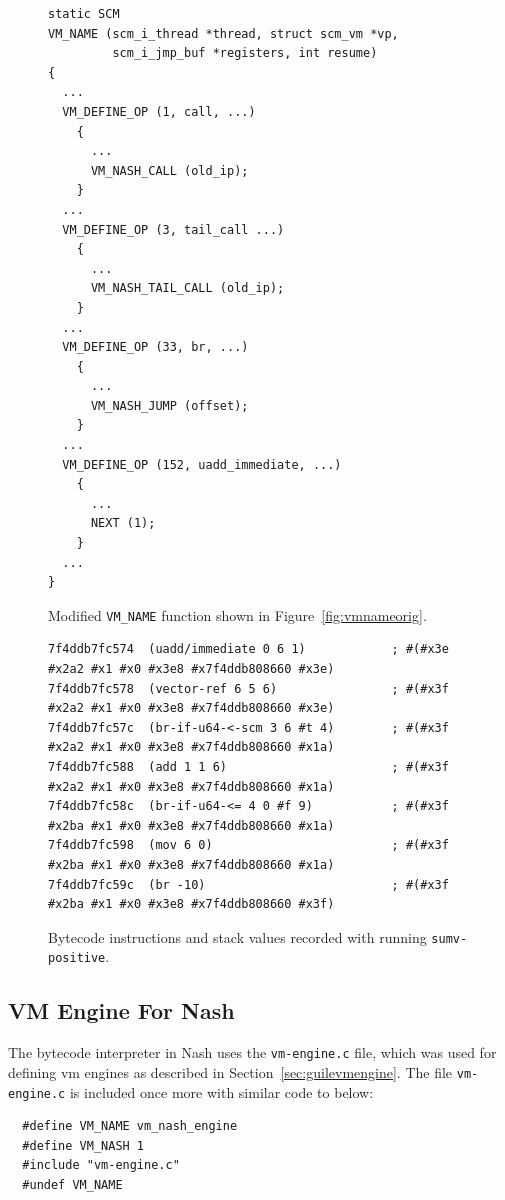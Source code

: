 \documentclass[preprint, 10pt]{sigplanconf}
\begin{document}
\begin{figure}
  \centering
  \small
\begin{verbatim}
static SCM
VM_NAME (scm_i_thread *thread, struct scm_vm *vp,
         scm_i_jmp_buf *registers, int resume)
{
  ...
  VM_DEFINE_OP (1, call, ...)
    {
      ...
      VM_NASH_CALL (old_ip);
    }
  ...
  VM_DEFINE_OP (3, tail_call ...)
    {
      ...
      VM_NASH_TAIL_CALL (old_ip);
    }
  ...
  VM_DEFINE_OP (33, br, ...)
    {
      ...
      VM_NASH_JUMP (offset);
    }
  ...
  VM_DEFINE_OP (152, uadd_immediate, ...)
    {
      ...
      NEXT (1);
    }
  ...
}
\end{verbatim}
\caption{Modified \texttt{VM\_NAME} function shown in
  Figure~\hyperref[fig:vmnameorig]{\ref{fig:vmnameorig}}.}
\label{fig:vmnamenash}
\end{figure}

\begin{figure}
  \centering
  \small
\begin{verbatim}
7f4ddb7fc574  (uadd/immediate 0 6 1)            ; #(#x3e #x2a2 #x1 #x0 #x3e8 #x7f4ddb808660 #x3e)
7f4ddb7fc578  (vector-ref 6 5 6)                ; #(#x3f #x2a2 #x1 #x0 #x3e8 #x7f4ddb808660 #x3e)
7f4ddb7fc57c  (br-if-u64-<-scm 3 6 #t 4)        ; #(#x3f #x2a2 #x1 #x0 #x3e8 #x7f4ddb808660 #x1a)
7f4ddb7fc588  (add 1 1 6)                       ; #(#x3f #x2a2 #x1 #x0 #x3e8 #x7f4ddb808660 #x1a)
7f4ddb7fc58c  (br-if-u64-<= 4 0 #f 9)           ; #(#x3f #x2ba #x1 #x0 #x3e8 #x7f4ddb808660 #x1a)
7f4ddb7fc598  (mov 6 0)                         ; #(#x3f #x2ba #x1 #x0 #x3e8 #x7f4ddb808660 #x1a)
7f4ddb7fc59c  (br -10)                          ; #(#x3f #x2ba #x1 #x0 #x3e8 #x7f4ddb808660 #x3f)
\end{verbatim}
\caption{Bytecode instructions and stack values recorded with running
  \texttt{sumv-positive}.}
\label{fig:trace}
\end{figure}

\subsection{VM Engine For Nash}
The bytecode interpreter in Nash uses the \texttt{vm-engine.c} file, which was
used for defining vm engines as described in
Section~\hyperref[sec:background]{\ref{sec:guilevmengine}}.  The file
\texttt{vm-engine.c} is included once more with similar code to below:

\begin{verbatim}
  #define VM_NAME vm_nash_engine
  #define VM_NASH 1
  #include "vm-engine.c"
  #undef VM_NAME
\end{verbatim}
\end{document}
